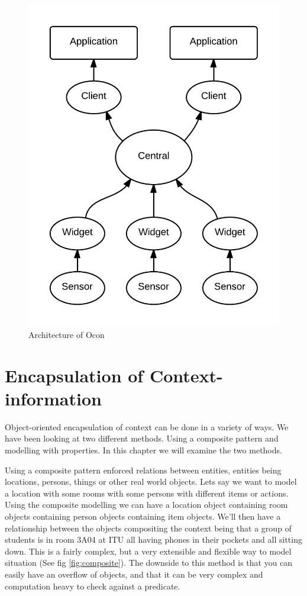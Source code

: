 \documentclass[../report.tex]{subfiles}
\begin{document}
\begin{figure}[H]
\centering
\includegraphics[scale=0.2]{grandarchitecture.png}
\caption{Architecture of Ocon}
\label{fig:GrandArchitecture}
\end{figure}

\section{Encapsulation of Context-information}
Object-oriented encapsulation of context can be done in a variety of ways. We have been looking at two different methods. Using a composite pattern and modelling with properties. In this chapter we will examine the two methods.

Using a composite pattern enforced relations between entities, entities being locations, persons, things or other real world objects. Lets say we want to model a location with some rooms with some persons with different items or actions. Using the composite modelling we can have a location object containing room objects containing person objects containing item objects. We'll then have a relationship between the objects compositing the context being that a group of students is in room 3A04 at ITU all having phones in their pockets and all sitting down. This is a fairly complex, but a very extensible and flexible way to model situation (See fig \ref{fig:composite}). The downside to this method is that you can easily have an overflow of objects, and that it can be very complex and computation heavy to check against a predicate.
\end{document}

